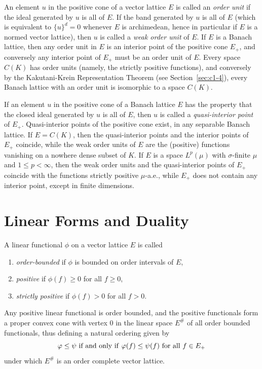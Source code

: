 An element $ u $ in the positive cone of a vector lattice $ E $ is called an \emph{order unit} if the ideal generated by $ u $ is all of\/ $ E $.
If the band generated by $ u $ is all of\/ $ E $ (which is equivalent to $ \{u\}^{d} = 0 $ whenever $ E $ is archimedean, hence in particular if\/ $ E $ is a normed vector lattice), then $ u $ is called a \emph{weak order unit} of\/ $ E $.
If\/ $ E $ is a Banach lattice, then any order unit in $ E $ is an interior point of the positive cone $ E_{+} $, and conversely any interior point of\/ $ E_{+} $ must be an order unit of\/ $ E $.
Every space $ C(K) $ has order units (namely, the strictly positive functions), and conversely by the Kakutani-Krein Representation Theorem (see Section~\ref{sec:c1-4}), every Banach lattice with an order unit is isomorphic to a space $ C(K) $.

If an element $ u $ in the positive cone of a Banach lattice $ E $ has the property that the closed ideal generated by $ u $ is all of\/ $ E $, then $ u $ is called a \emph{quasi-interior point} of\/ $ E_{+} $.
Quasi-interior points of the positive cone exist, \eg in any separable Banach lattice.
If\/ $ E = C(K) $, then the quasi-interior points and the interior points of\/ $ E_{+} $ coincide, while the weak order units of\/ $ E $ are the (positive) functions vanishing on a nowhere dense subset of\/ $ K $.
If\/ $ E $ is a space $ L^{p}(\mu) $ with $ \sigma $-finite $ \mu $ and $ 1 \leq p < \infty $, then the weak order units and the quasi-interior points of\/ $ E_{+} $ coincide with the functions strictly positive $ \mu $-a.e., while $ E_{+} $ does not contain any interior point, except in finite dimensions.
\section{Linear Forms and Duality}\label{sec:c1-3}%
A linear functional $ \phi $ on a vector lattice $ E $ is called
\begin{enumerate}[\upshape (i)]

\item
\emph{order-bounded} if\/ $ \phi $ is bounded on order intervals of\/ $ E $,

\item
\emph{positive} if\/ $ \phi(f) \geq 0 $ for all  $ f \geq 0 $, 

\item
\emph{strictly positive} if\/ $ \phi(f) > 0 $ for all  $ f > 0 $.

\end{enumerate}
Any positive linear functional is order bounded, and the positive functionals form a proper convex cone with vertex $ 0 $ in the linear space $ E^{\#} $ of all order bounded functionals, thus defining a natural
ordering given by 
%
\[
	\text{$ \phi \leq \psi $ if and only if\/ $ \phi(f) \leq \psi(f) $ for all $ f \in E_{+} $}
\]
%
under which $ E^{\#} $ is an order complete vector lattice.

